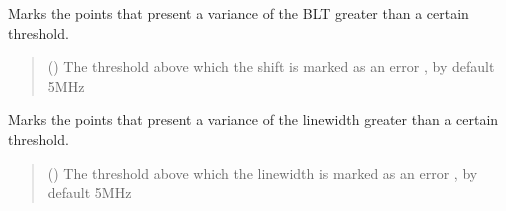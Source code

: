 \documentclass[letterpaper,10pt,english]{sphinxmanual}
\begin{document}
\begin{fulllineitems}
\begin{fulllineitems}
\label{\detokenize{source/_autosummary/HDF5_BLS_treat.Treat:HDF5_BLS_treat.Treat.mark_errors_std_BLT}}
\pysigstartsignatures
\pysiglinewithargsret
{}
{}
{}
\pysigstopsignatures
\sphinxAtStartPar
Marks the points that present a variance of the BLT greater than a certain threshold.
\begin{quote}\begin{description}
\sphinxAtStartPar
{} (\sphinxstyleliteralemphasis{\sphinxupquote{, }}) \textendash{} The threshold above which the shift is marked as an error , by default 5MHz

\end{description}\end{quote}

\end{fulllineitems}


\begin{fulllineitems}
\label{\detokenize{source/_autosummary/HDF5_BLS_treat.Treat:HDF5_BLS_treat.Treat.mark_errors_std_linewidth}}
\pysigstartsignatures
\pysiglinewithargsret
{}
{}
{}
\pysigstopsignatures
\sphinxAtStartPar
Marks the points that present a variance of the linewidth greater than a certain threshold.
\begin{quote}\begin{description}
\sphinxAtStartPar
{} (\sphinxstyleliteralemphasis{\sphinxupquote{, }}) \textendash{} The threshold above which the linewidth is marked as an error , by default 5MHz


\end{description}
\end{quote}
\end{fulllineitems}
\end{fulllineitems}
\end{document}
